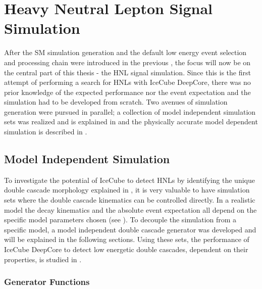 \setchapterpreamble[u]{\margintoc}

\chapter{Heavy Neutral Lepton Signal Simulation}

After the SM simulation generation and the default low energy event selection and processing chain were introduced in the previous , the focus will now be on the central part of this thesis - the HNL signal simulation. Since this is the first attempt of performing a search for HNLs with IceCube DeepCore, there was no prior knowledge of the expected performance nor the event expectation and the simulation had to be developed from scratch. Two avenues of simulation generation were pursued in parallel; a collection of model independent simulation sets was realized and is explained in  and the physically accurate model dependent simulation is described in .


\section{Model Independent Simulation} 

To investigate the potential of IceCube to detect HNLs by identifying the unique double cascade morphology explained in , it is very valuable to have simulation sets where the double cascade kinematics can be controlled directly. In a realistic model the decay kinematics and the absolute event expectation all depend on the specific model parameters chosen (see ). To decouple the simulation from a specific model, a model independent double cascade generator was developed and will be explained in the following sections. Using these sets, the performance of IceCube DeepCore to detect low energetic double cascades, dependent on their properties, is studied in .


\subsection{Generator Functions}




